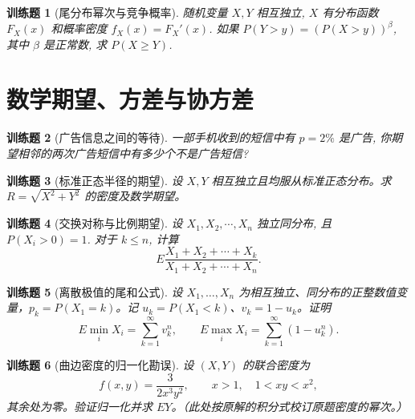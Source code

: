 \documentclass[UTF8,12pt,a4paper,fontset=fandol]{ctexbook}
\newtheorem{exercise}{训练题}[section]
\begin{document}
\begin{exercise}[尾分布幂次与竞争概率]\label{q:A4.32}
随机变量 $X,Y$ 相互独立, $X$ 有分布函数 $F_X(x)$ 和概率密度 $f_X(x)=F_X'(x)$. 如果 $P(Y>y)=(P(X>y))^\beta$, 其中 $\beta$ 是正常数, 求 $P(X\geq Y)$.\par{}\end{exercise}

\clearpage\section{数学期望、方差与协方差}

\begin{exercise}[广告信息之间的等待]\label{q:A5.5}
一部手机收到的短信中有 $p=2\%$ 是广告, 你期望相邻的两次广告短信中有多少个不是广告短信?\par{}\end{exercise}

\begin{exercise}[标准正态半径的期望]\label{q:A5.8}
设 $X,Y$ 相互独立且均服从标准正态分布。求 $R=\sqrt{X^2+Y^2}$ 的密度及数学期望。\par{}\end{exercise}

\begin{exercise}[交换对称与比例期望]\label{q:A5.9}
设 $X_1,X_2,\cdots,X_n$ 独立同分布, 且 $P(X_i>0)=1$. 对于 $k\leq n$, 计算
    \[E\dfrac{X_1+X_2+\cdots+X_k}{X_1+X_2+\cdots+X_n}.\]\par{}\end{exercise}

\begin{exercise}[离散极值的尾和公式]\label{q:A5.12}
设 $X_1,\ldots,X_n$ 为相互独立、同分布的正整数值变量，$p_k=P(X_1=k)$。记 $u_k=P(X_1<k)$、$v_k=1-u_k$。证明\[E\min_iX_i=\sum_{k=1}^\infty v_k^n,\qquad E\max_iX_i=\sum_{k=1}^\infty(1-u_k^n).\]\par{}\end{exercise}

\begin{exercise}[曲边密度的归一化勘误]\label{q:A5.14}
设 $(X,Y)$ 的联合密度为\[f(x,y)=\frac{3}{2x^3y^2},\qquad x>1,\quad 1<xy<x^2,\]其余处为零。验证归一化并求 $EY$。（此处按原解的积分式校订原题密度的幂次。）\par{}\end{exercise}
\end{document}
